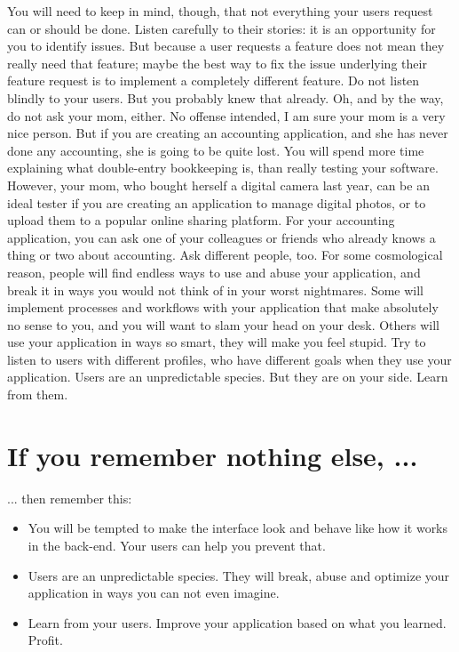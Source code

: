 You will need to keep in mind, though, that not everything your users request
can or should be done. Listen carefully to their stories: it is an opportunity
for you to identify issues. But because a user requests a feature does not mean
they really need that feature; maybe the best way to fix the issue underlying
their feature request is to implement a completely different feature. Do not
listen blindly to your users. But you probably knew that already. 
\newline
Oh, and by the way, do not ask your mom, either.
\newline
No offense intended, I am sure your mom is a very nice person. But if you are
creating an accounting application, and she has never done any accounting, she
is going to be quite lost. You will spend more time explaining what double-entry
bookkeeping is, than really testing your software. However, your mom, who bought
herself a digital camera last year, can be an ideal tester if you are creating
an application to manage digital photos, or to upload them to a popular online
sharing platform. For your accounting application, you can ask one of your
colleagues or friends who already knows a thing or two about accounting.
\newline
Ask different people, too.
\newline
For some cosmological reason, people will find endless ways to use and abuse
your application, and break it in ways you would not think of in your worst
nightmares. Some will implement processes and workflows with your application
that make absolutely no sense to you, and you will want to slam your head on
your desk. Others will use your application in ways so smart, they will make you
feel stupid. Try to listen to users with different profiles, who have different
goals when they use your application.
\newline
Users are an unpredictable species. But they are on your side. Learn from them.

\section*{If you remember nothing else, ...}
... then remember this:
\begin{itemize}
 \item You will be tempted to make the interface look and behave like how it
works in the back-end. Your users can help you prevent that.
 \item Users are an unpredictable species. They will break, abuse and optimize
your application in ways you can not even imagine.
 \item Learn from your users. Improve your application based on what you
learned. Profit.
\end{itemize}
